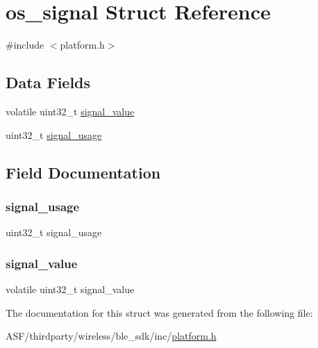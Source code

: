 \hypertarget{structos__signal}{}\section{os\+\_\+signal Struct Reference}
\label{structos__signal}


{\ttfamily \#include $<$platform.\+h$>$}

\subsection*{Data Fields}
\begin{DoxyCompactItemize}
\item 
volatile uint32\+\_\+t \mbox{\hyperlink{structos__signal_a1da1fcfbdb3ff7753b4c1e7e7a554ac8}{signal\+\_\+value}}
\item 
uint32\+\_\+t \mbox{\hyperlink{structos__signal_ac8b287a9110d769949a93cdd3d79cdeb}{signal\+\_\+usage}}
\end{DoxyCompactItemize}


\subsection{Field Documentation}
\mbox{\label{structos__signal_ac8b287a9110d769949a93cdd3d79cdeb}} 
\subsubsection{\texorpdfstring{signal\_usage}{signal\_usage}}
{\footnotesize\ttfamily uint32\+\_\+t signal\+\_\+usage}

\mbox{\label{structos__signal_a1da1fcfbdb3ff7753b4c1e7e7a554ac8}} 
\subsubsection{\texorpdfstring{signal\_value}{signal\_value}}
{\footnotesize\ttfamily volatile uint32\+\_\+t signal\+\_\+value}



The documentation for this struct was generated from the following file\+:\begin{DoxyCompactItemize}
\item 
A\+S\+F/thirdparty/wireless/ble\+\_\+sdk/inc/\mbox{\hyperlink{platform_8h}{platform.\+h}}\end{DoxyCompactItemize}

